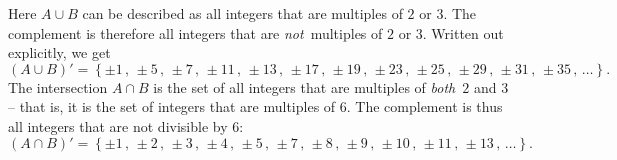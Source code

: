 \documentclass[12pt,letterpaper]{article}
\begin{document}
\begin{enumerate}
%
%
%

  
  \Answer
  Here $A\cup B$ can be described as all integers that are multiples
  of $2$ or $3$.  The complement is therefore all integers that are
  \emph{not}\ multiples of $2$ or $3$.  Written out explicitly, we get
  \begin{equation*}
    \left(A \cup B \right)'
    = \left\{ \pm1\,,\,\pm5\,,\,\pm7\,,\,\pm11\,,\,\pm13\,,\,\pm17\,,\,\pm19\,,\,\pm23\,,\,\pm25\,,\,\pm29\,,\,\pm31\,,\,\pm35\,,\,\ldots\right\}.
  \end{equation*}
  The intersection $A\cap B$ is the set of all integers that are
  multiples of \emph{both}\ $2$ and $3$ -- that is, it is the set of
  integers that are multiples of $6$.  The complement is thus all
  integers that are not divisible by $6$:
  \begin{equation*}
    \left(A \cap B \right)'
    = \left\{ \pm1\,,\,\pm2\,,\,\pm3\,,\,\pm4\,,\,\pm5\,,\,\pm7\,,\,\pm8\,,\,\pm9\,,\,\pm10\,,\,\pm11\,,\,\pm13\,,\,\ldots\right\}.
  \end{equation*}


\end{enumerate}
\end{document}
